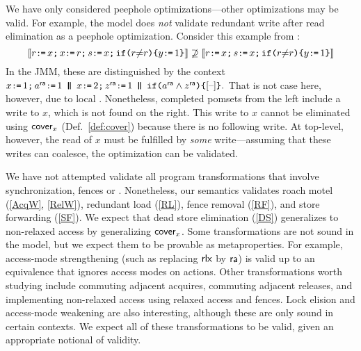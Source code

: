 We have only considered peephole optimizations---other optimizations may be
valid.  For example, the model does \emph{not} validate redundant write after
read elimination as a peephole optimization.  Consider this example from
\cite[.1]{SevcikThesis}:
\begin{displaymath}
  \llbracket r\texttt{:}\mkern-1mu\texttt{=}\, x\texttt{;}\,\allowbreak x\texttt{:}\mkern-1mu\texttt{=}\, r\texttt{;}\,\allowbreak s\texttt{:}\mkern-1mu\texttt{=}\, x \texttt{;}\,\allowbreak \texttt{if}\allowbreak\texttt{(}r {\neq} r\texttt{)} \allowbreak\texttt{\{} y \texttt{:}\mkern-1mu\texttt{=}\, 1 \texttt{\}}\rrbracket
  \not\supseteq
  \llbracket r\texttt{:}\mkern-1mu\texttt{=}\, x\texttt{;}\,\allowbreak s\texttt{:}\mkern-1mu\texttt{=}\, x  \texttt{;}\,\allowbreak \texttt{if}\allowbreak\texttt{(}r {\neq} r\texttt{)} \allowbreak\texttt{\{} y \texttt{:}\mkern-1mu\texttt{=}\, 1 \texttt{\}}\rrbracket
\end{displaymath}
In the JMM, these are distinguished by the context
\begin{math}
  x\GETS1 \SEMI a^\modeRA\GETS 1
  \PAR x\GETS2 \SEMI z^\modeRA\GETS 1
  \PAR \IF{a^\modeRA \land z^\modeRA} \THEN \hole{}\FI.
\end{math}
That is not case here, however, due to local \drfsc{}.  Nonetheless,
completed pomsets from the left include a write to $x$, which is not found on
the right.  This write to $x$ cannot be eliminated using $\relfilt[]{\aLoc}$
(Def.~\ref{def:cover}) because there is no following write.  At top-level,
however, the read of $x$ must be fulfilled by \emph{some} write---assuming
that these writes can coalesce, the optimization can be validated.

We have not attempted validate all program transformations that involve
synchronization, fences or \RMWs{}
\cite{DBLP:conf/popl/VafeiadisBCMN15,DBLP:phd/hal/Morisset17}.  Nonetheless,
our semantics validates roach motel (\ref{AcqW}, \ref{RelW}), redundant load
(\ref{RL}), fence removal (\ref{RF}), and store forwarding (\ref{SF}).  We
expect that dead store elimination (\ref{DS}) generalizes to non-relaxed
access by generalizing $\relfilt[]{\aLoc}$.  Some transformations are not
sound in the model, but we expect them to be provable as metaproperties.  For
example, access-mode strengthening (such as replacing ${\mathsf{rlx}}$ by
${\mathsf{ra}}$) is valid up to an equivalence that ignores access modes on
actions.  Other transformations worth studying include commuting adjacent
acquires, commuting adjacent releases, and implementing non-relaxed access
using relaxed access and fences.
%
%
Lock elision and access-mode weakening are also interesting, although these
are only sound in certain contexts.
%
We expect all of these transformations to be valid, given an appropriate
notional of validity.


